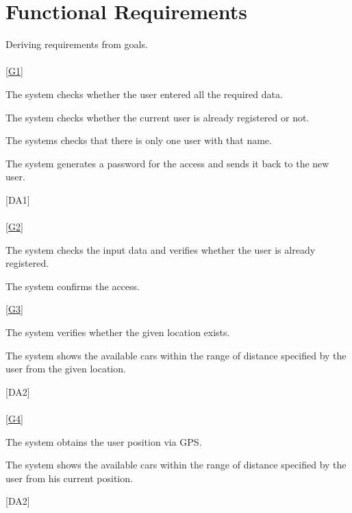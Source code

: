 \documentclass[11pt,a4paper]{report}
\begin{document}
\section{Functional Requirements}
Deriving requirements from goals.\\
\noindent \\
\noindent \ref{G1} \\
\begin{Req}
\item The system checks whether the user entered all the required data.
\item	The system checks whether the current user is already registered or not.
\item The systems checks that there is only one user with that name.
\item The system generates a password for the access and sends it back to the new user.
\end{Req}
\hspace{0.4cm}[DA1]\\
\noindent\\
\ref{G2} \\
\begin{Req}[resume]
\item The system checks the input data and verifies whether the user is already registered.
\item The system confirms the access.
\end{Req}
\noindent
\ref{G3} \\
\begin{Req}[resume]
\item The system verifies whether the given location exists.
\item The system shows the available cars within the range of distance specified by the user from the given location.
\end{Req}
\hspace{0.4cm}[DA2] \\
\noindent\\
\ref{G4} \\
\begin{Req}[resume]
\item The system obtains the user position via GPS.
\item The system shows the available cars within the range of distance specified by the user from his current position.
\end{Req}
\hspace{0.4cm}[DA2] \\
\end{document}
